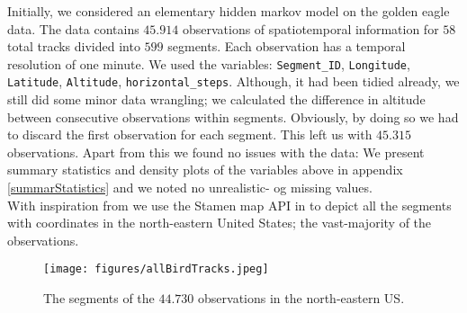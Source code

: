 Initially, we considered an elementary hidden markov model on the golden eagle data. The data contains $45.914$ observations of spatiotemporal information for $58$ total tracks divided into $599$ segments. Each observation has a temporal resolution of one minute.\cite{eagleData} We used the variables: \texttt{Segment\_ID}, \texttt{Longitude}, \texttt{Latitude}, \texttt{Altitude}, \texttt{horizontal\_steps}. Although, it had been tidied already, we still did some minor data wrangling; we calculated the difference in altitude between consecutive observations within segments. Obviously, by doing so we had to discard the first observation for each segment. This left us with $45.315$ observations. Apart from this we found no issues with the data: We present summary statistics and density plots of the variables above in appendix \ref{summarStatistics} and we noted no unrealistic- og missing values.\\ With inspiration from \cite{Pirotta2018} we use the Stamen map API in \cite{ggmap} to depict all the segments with coordinates in the north-eastern United States; the vast-majority of the observations.
\begin{figure}[h]
    \begin{center}
        \texttt{[image: figures/allBirdTracks.jpeg]}
        \caption{The segments of the $44.730$ observations in the north-eastern US.}
    \end{center}
\end{figure}
